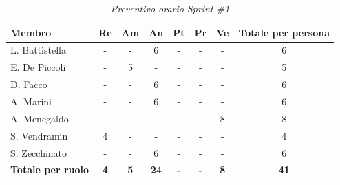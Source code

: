 ﻿\documentclass[a4paper, 10pt, colorlinks=true, linkcolor=black, urlcolor=blue, citecolor=blue, hidelinks]{article}
\renewcommand{\arraystretch}{1.2}
\begin{document}
\begin{table}[H]
    \centering
    \renewcommand{\arraystretch}{1.4}
    \begin{tabular}{|l|c|c|c|c|c|c|c|}
        \hline
        \rowcolor{bluBitless!15}
        \textbf{Membro} & \textbf{Re} & \textbf{Am} & \textbf{An} & \textbf{Pt} & \textbf{Pr} & \textbf{Ve} & \textbf{Totale per persona} \\
        \hline
        L. Battistella & - & - & 6 & - & - & - & 6 \\ \hline
        E. De Piccoli & - & 5 & - & - & - & - & 5 \\ \hline
        D. Facco & - & - & 6 & - & - & - & 6 \\ \hline
        A. Marini & - & - & 6 & - & - & - & 6 \\ \hline
        A. Menegaldo & - & - & - & - & - & 8 & 8 \\ \hline
        S. Vendramin & 4 & - & - & - & - & - & 4 \\ \hline
        S. Zecchinato & - & - & 6 & - & - & - & 6 \\ \hline
        \rowcolor{bluBitless!8}
        \textbf{Totale per ruolo} & \textbf{4} & \textbf{5} & \textbf{24} & \textbf{-} & \textbf{-} & \textbf{8} & \textbf{41} \\
        \hline
    \end{tabular}
    \caption{\textit{Preventivo orario Sprint \#1}}
\end{table}
\end{document}
